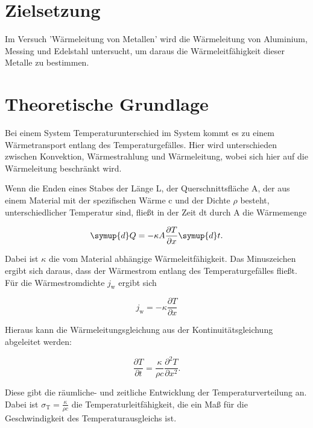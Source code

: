 \section{Zielsetzung}
    Im Versuch 'Wärmeleitung von Metallen' wird die Wärmeleitung von Aluminium, Messing und Edelstahl untersucht,
    um daraus die Wärmeleitfähigkeit dieser Metalle zu bestimmen.

    \section{Theoretische Grundlage}
      Bei einem System Temperaturunterschied im System kommt es zu einem Wärmetransport entlang des Temperaturgefälles.
      Hier wird unterschieden zwischen Konvektion, Wärmestrahlung und Wärmeleitung, wobei sich hier auf die Wärmeleitung beschränkt wird.

      \noindent Wenn die Enden eines Stabes der Länge L, der Querschnittsfläche A, der aus einem Material mit der spezifischen Wärme c und der Dichte $\rho$ besteht, unterschiedlicher Temperatur sind,
      fließt in der Zeit dt durch A die Wärmemenge 

      \begin{equation}
      \symup{d}Q = - \kappa A \frac{\partial T}{\partial x} \symup{d}t .
        \label{eqn:waermemenge}
      \end{equation}

      \noindent Dabei ist $\kappa$ die vom Material abhängige Wärmeleitfähigkeit. 
      Das Minuszeichen ergibt sich daraus, dass der Wärmestrom entlang des Temperaturgefälles fließt.
      Für die Wärmestromdichte $j_\text{w}$ ergibt sich

      \begin{equation*}
      j_\text{w}=-\kappa \frac{\partial T}{\partial x}
        \label{eqn:waermestromdichte}
      \end{equation*}       
      
      \noindent Hieraus kann die Wärmeleitungsgleichung aus der Kontinuitätsgleichung abgeleitet werden:

      \begin{equation*}
      \frac{\partial T}{\partial t} = \frac{\kappa}{\rho c} \frac{\partial^2 T}{\partial x^2}.
        \label{eqn:waermeleitungsgleichung}
      \end{equation*}  

      \noindent Diese gibt die räumliche- und zeitliche Entwicklung der Temperaturverteilung an.
      Dabei ist $\sigma_\text{T} = \frac{\kappa}{\rho c}$ die Temperaturleitfähigkeit, die ein Maß für die Geschwindigkeit des Temperaturausgleichs ist.

